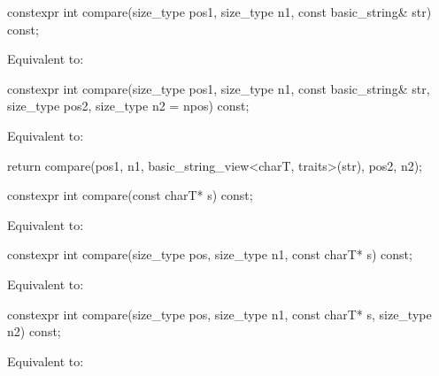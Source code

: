 %
\begin{itemdecl}
constexpr int compare(size_type pos1, size_type n1, const basic_string& str) const;
\end{itemdecl}

\begin{itemdescr}
\pnum
\effects
Equivalent to:
\end{itemdescr}

%
\begin{itemdecl}
constexpr int compare(size_type pos1, size_type n1, const basic_string& str,
                      size_type pos2, size_type n2 = npos) const;
\end{itemdecl}

\begin{itemdescr}
\pnum
\effects
Equivalent to:
\begin{codeblock}
return compare(pos1, n1, basic_string_view<charT, traits>(str), pos2, n2);
\end{codeblock}
\end{itemdescr}

%
\begin{itemdecl}
constexpr int compare(const charT* s) const;
\end{itemdecl}

\begin{itemdescr}
\pnum
\effects
Equivalent to:
\end{itemdescr}

%
\begin{itemdecl}
constexpr int compare(size_type pos, size_type n1, const charT* s) const;
\end{itemdecl}

\begin{itemdescr}
\pnum
\effects
Equivalent to: 
\end{itemdescr}

%
\begin{itemdecl}
constexpr int compare(size_type pos, size_type n1, const charT* s, size_type n2) const;
\end{itemdecl}

\begin{itemdescr}
\pnum
\effects
Equivalent to: 
\end{itemdescr}

